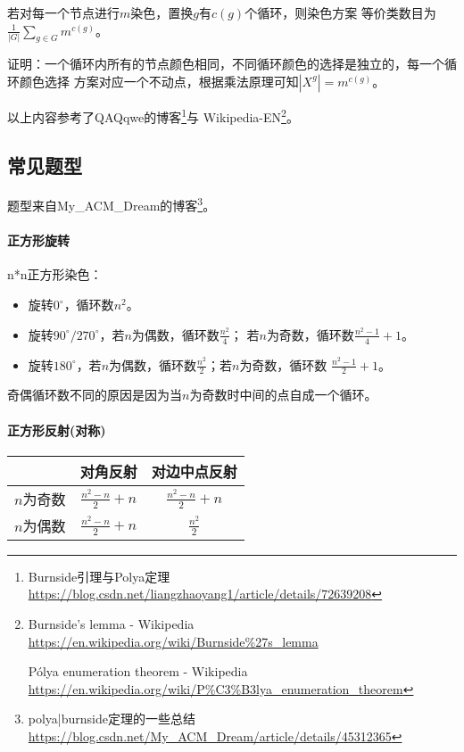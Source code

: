 \begin{theorem}
	若对每一个节点进行$m$染色，置换$g$有$c(g)$个循环，则染色方案
	等价类数目为$\displaystyle \frac{1}{|G|}\sum_{g\in G}m^{c(g)}$。
\end{theorem}

证明：一个循环内所有的节点颜色相同，不同循环颜色的选择是独立的，每一个循环颜色选择
方案对应一个不动点，根据乘法原理可知$|X^g|=m^{c(g)}$。

以上内容参考了QAQqwe的博客\footnote{Burnside引理与Polya定理
	\url{https://blog.csdn.net/liangzhaoyang1/article/details/72639208}}与
Wikipedia-EN\footnote{
	Burnside's lemma - Wikipedia
	\url{https://en.wikipedia.org/wiki/Burnside\%27s\_lemma}

	Pólya enumeration theorem - Wikipedia
	\url{https://en.wikipedia.org/wiki/P\%C3\%B3lya\_enumeration\_theorem}
}。

\subsection{常见题型}
题型来自My\_ACM\_Dream的博客\footnote{polya|burnside定理的一些总结\\
	\url{https://blog.csdn.net/My\_ACM\_Dream/article/details/45312365}}。

\paragraph{正方形旋转}
n*n正方形染色：
\begin{itemize}
	\item 旋转$0^\circ$，循环数$n^2$。
	\item 旋转$90^\circ/270^\circ$，若$n$为偶数，循环数$\frac{n^2}{4}$；
	      若$n$为奇数，循环数$\frac{n^2-1}{4}+1$。
	\item 旋转$180^\circ$，若$n$为偶数，循环数$\frac{n^2}{2}$；若$n$为奇数，循环数
		  $\frac{n^2-1}{2}+1$。
\end{itemize}
奇偶循环数不同的原因是因为当$n$为奇数时中间的点自成一个循环。
\paragraph{正方形反射(对称)}
\begin{tabular}{|c|c|c|}
	\hline
	          & 对角反射            & 对边中点反射        \\
	\hline
	$n$为奇数 & $\frac{n^2-n}{2}+n$ & $\frac{n^2-n}{2}+n$ \\
	\hline
	$n$为偶数 & $\frac{n^2-n}{2}+n$ & $\frac{n^2}{2}$     \\
	\hline
\end{tabular}
